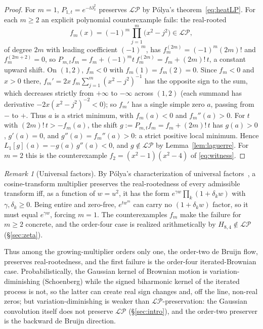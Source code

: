 \documentclass[11pt,reqno]{amsart}
\theoremstyle{plain}
\theoremstyle{definition}
\theoremstyle{remark}
\newtheorem{remark}[theorem]{Remark}
\newcommand{\LP}{\mathcal{LP}}
\begin{document}
\begin{proof}
For $m=1$, $P_{1,t}=e^{-t\partial_x^2}$ preserves $\LP$ by P\'olya's
theorem~\eqref{eq:heatLP}. For each $m\ge2$ an explicit polynomial counterexample fails:
the real-rooted
\[
   f_m(x)=(-1)^m\prod_{j=1}^m\bigl(x^2-j^2\bigr)\in\LP,
\]
of degree $2m$ with leading coefficient $(-1)^m$, has $f_m^{(2m)}=(-1)^m(2m)!$
and $f_m^{(2m+2)}=0$, so $P_{m,t}f_m=f_m+(-1)^m t\,f_m^{(2m)}=f_m+(2m)!\,t$, a
constant upward shift. On $(1,2)$, $f_m<0$ with $f_m(1)=f_m(2)=0$. Since
$f_m<0$ and $x>0$ there, $f_m'=2x\,f_m\sum_{j=1}^m(x^2-j^2)^{-1}$ has the
opposite sign to the sum, which decreases strictly from $+\infty$ to $-\infty$
across $(1,2)$ (each summand has derivative $-2x(x^2-j^2)^{-2}<0$); so $f_m'$ has
a single simple zero $a$, passing from $-$ to $+$. Thus $a$ is a strict minimum,
with $f_m(a)<0$ and $f_m''(a)>0$. For $t$ with $(2m)!\,t>-f_m(a)$, the shift
$g:=P_{m,t}f_m=f_m+(2m)!\,t$ has $g(a)>0$, $g'(a)=0$, and $g''(a)=f_m''(a)>0$: a
strict positive local minimum. Hence $L_1[g](a)=-g(a)\,g''(a)<0$, and
$g\notin\LP$ by Lemma~\ref{lem:laguerre}. For $m=2$ this is the counterexample
$f_2=(x^2-1)(x^2-4)$ of \eqref{eq:witness}.
\end{proof}

\begin{remark}[Universal factors]\label{rem:universal}
By P\'olya's characterization of universal
factors~\cite{Polya27,deBruijn}, a cosine-transform multiplier preserves the
real-rootedness of every admissible transform iff, as a function of $w=u^2$, it
has the form $e^{\gamma w}\prod_k(1+\delta_kw)$ with $\gamma,\delta_k\ge0$. Being
entire and zero-free, $e^{tw^m}$ can carry no $(1+\delta_kw)$ factor, so it must
equal $e^{\gamma w}$, forcing $m=1$. The counterexamples $f_m$ make the failure for
$m\ge2$ concrete, and the order-four case is realized arithmetically by
$H_{8,4}\notin\LP$ (\S\ref{sec:zeta}).
\end{remark}

Thus among the growing-multiplier orders only one, the order-two de Bruijn
flow, preserves real-rootedness, and the first failure is the order-four
iterated-Brownian case. Probabilistically, the Gaussian kernel of Brownian
motion is variation-diminishing (Schoenberg) while the signed biharmonic kernel
of the iterated process is not, so the latter can create real sign changes and,
off the line, non-real zeros; but variation-diminishing is weaker than
$\LP$-preservation: the Gaussian convolution itself does not preserve $\LP$
(\S\ref{sec:intro}), and the order-two preserver is the backward de Bruijn
direction.
\end{document}
